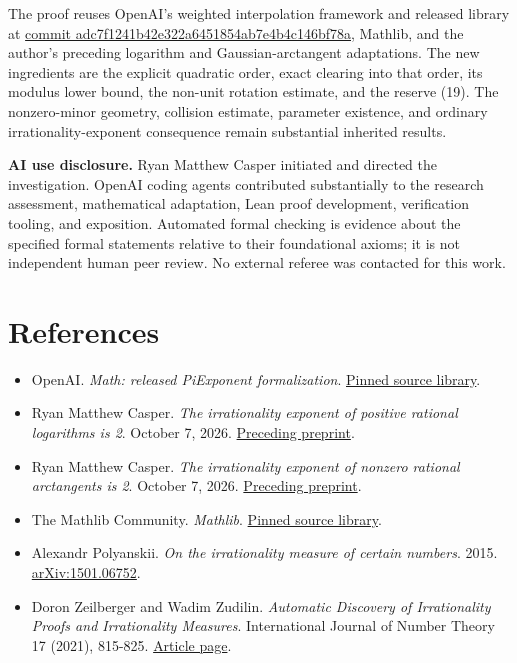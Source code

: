 \documentclass[11pt]{article}
\providecommand{\tightlist}{\setlength{\itemsep}{0pt}\setlength{\parskip}{0pt}}
\begin{document}
The proof reuses OpenAI's weighted interpolation framework and released
library at
\href{https://github.com/openai/math/tree/adc7f1241b42e322a6451854ab7e4b4c146bf78a}{commit
adc7f1241b42e322a6451854ab7e4b4c146bf78a}, Mathlib, and the author's
preceding logarithm and Gaussian-arctangent adaptations. The new
ingredients are the explicit quadratic order, exact clearing into that
order, its modulus lower bound, the non-unit rotation estimate, and the
reserve (19). The nonzero-minor geometry, collision estimate, parameter
existence, and ordinary irrationality-exponent consequence remain
substantial inherited results.

\textbf{AI use disclosure.} Ryan Matthew Casper initiated and directed
the investigation. OpenAI coding agents contributed substantially to the
research assessment, mathematical adaptation, Lean proof development,
verification tooling, and exposition. Automated formal checking is
evidence about the specified formal statements relative to their
foundational axioms; it is not independent human peer review. No
external referee was contacted for this work.

\section{References}\label{references}

\begingroup\raggedright

\begin{itemize}
\tightlist
\item
  OpenAI. \emph{Math: released PiExponent formalization}.
  \href{https://github.com/openai/math/tree/adc7f1241b42e322a6451854ab7e4b4c146bf78a}{Pinned
  source library}.
\item
  Ryan Matthew Casper. \emph{The irrationality exponent of positive
  rational logarithms is 2}. October 7, 2026.
  \href{../The-irrationality-exponent-of-positive-rational-logarithms-is-2-October-7-2026/paper.pdf}{Preceding
  preprint}.
\item
  Ryan Matthew Casper. \emph{The irrationality exponent of nonzero
  rational arctangents is 2}. October 7, 2026.
  \href{../The-irrationality-exponent-of-nonzero-rational-arctangents-is-2-October-7-2026/paper.pdf}{Preceding
  preprint}.
\item
  The Mathlib Community. \emph{Mathlib}.
  \href{https://github.com/leanprover-community/mathlib4/tree/d13f23b723b8a846827a245b89c10fc7d3f11612}{Pinned
  source library}.
\item
  Alexandr Polyanskii. \emph{On the irrationality measure of certain
  numbers}. 2015.
  \href{https://arxiv.org/abs/1501.06752}{arXiv:1501.06752}.
\item
  Doron Zeilberger and Wadim Zudilin. \emph{Automatic Discovery of
  Irrationality Proofs and Irrationality Measures}. International
  Journal of Number Theory 17 (2021), 815-825.
  \href{https://sites.math.rutgers.edu/~zeilberg/mamarim/mamarimhtml/gat.html}{Article
  page}.
\end{itemize}

\endgroup
\end{document}
